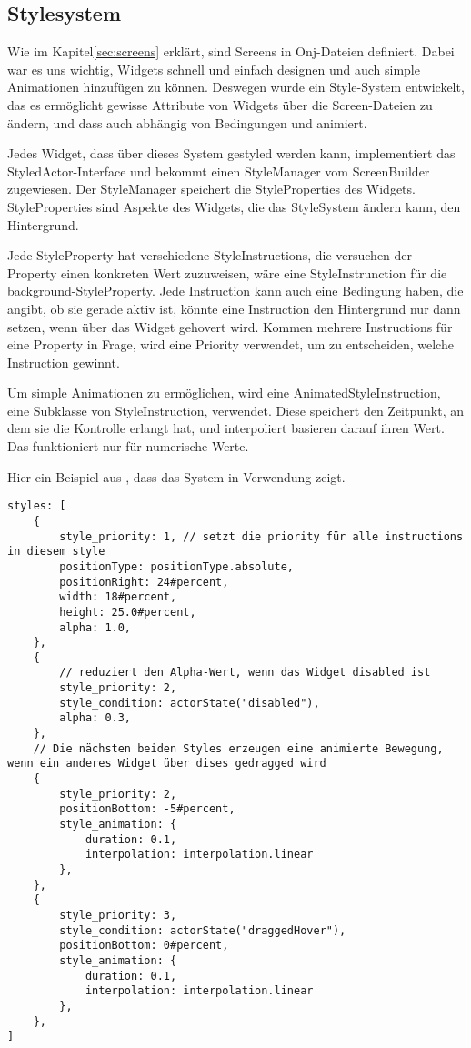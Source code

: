 
\subsection{Stylesystem}\label{subsec:stylesystem}

\renewcommand{\kapitelautor}{Autor: Marvin Kurka}

Wie im Kapitel\ref{sec:screens} erklärt, sind Screens in Onj-Dateien definiert.
Dabei war es uns wichtig, Widgets schnell und einfach designen und auch simple Animationen hinzufügen zu können.
Deswegen wurde ein Style-System entwickelt, das es ermöglicht gewisse Attribute von Widgets über die Screen-Dateien
zu ändern, und dass auch abhängig von Bedingungen und animiert.

Jedes Widget, dass über dieses System gestyled werden kann, implementiert das StyledActor-Interface und
bekommt einen StyleManager vom ScreenBuilder zugewiesen.
Der StyleManager speichert die StyleProperties des Widgets.
StyleProperties sind Aspekte des Widgets, die das StyleSystem ändern kann, \zB den Hintergrund.

Jede StyleProperty hat verschiedene StyleInstructions, die versuchen der Property einen konkreten Wert zuzuweisen,
\zB {} wäre eine StyleInstrunction für die background-StyleProperty.
Jede Instruction kann auch eine Bedingung haben, die angibt, ob sie gerade aktiv ist, \zB könnte eine Instruction
den Hintergrund nur dann setzen, wenn über das Widget gehovert wird.
Kommen mehrere Instructions für eine Property in Frage, wird eine Priority verwendet, um zu entscheiden, welche
Instruction gewinnt.

Um simple Animationen zu ermöglichen, wird eine AnimatedStyleInstruction, eine Subklasse von StyleInstruction, verwendet.
Diese speichert den Zeitpunkt, an dem sie die Kontrolle erlangt hat, und interpoliert basieren darauf ihren Wert.
Das funktioniert nur für numerische Werte.

Hier ein Beispiel aus , dass das System in Verwendung zeigt.

\begin{verbatim}
styles: [
    {
        style_priority: 1, // setzt die priority für alle instructions in diesem style
        positionType: positionType.absolute,
        positionRight: 24#percent,
        width: 18#percent,
        height: 25.0#percent,
        alpha: 1.0,
    },
    {
        // reduziert den Alpha-Wert, wenn das Widget disabled ist
        style_priority: 2,
        style_condition: actorState("disabled"),
        alpha: 0.3,
    },
    // Die nächsten beiden Styles erzeugen eine animierte Bewegung, wenn ein anderes Widget über dises gedragged wird
    {
        style_priority: 2,
        positionBottom: -5#percent,
        style_animation: {
            duration: 0.1,
            interpolation: interpolation.linear
        },
    },
    {
        style_priority: 3,
        style_condition: actorState("draggedHover"),
        positionBottom: 0#percent,
        style_animation: {
            duration: 0.1,
            interpolation: interpolation.linear
        },
    },
]
\end{verbatim}

